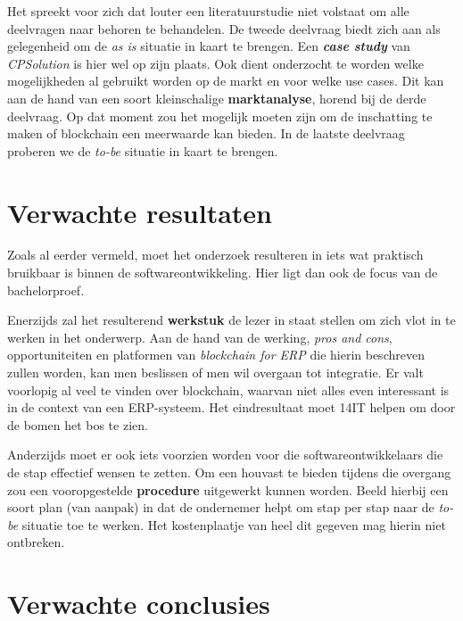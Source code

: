 Het spreekt voor zich dat louter een literatuurstudie niet volstaat om alle deelvragen naar behoren te behandelen. 
De tweede deelvraag biedt zich aan als gelegenheid om de \textit{as is} situatie in kaart te brengen. Een \textbf{\textit{case study}} van \textit{CPSolution} is hier wel op zijn plaats. Ook dient onderzocht te worden welke mogelijkheden al gebruikt worden op de markt en voor welke use cases. Dit kan aan de hand van een soort kleinschalige \textbf{marktanalyse}, horend bij de derde deelvraag. Op dat moment zou het mogelijk moeten zijn om de inschatting te maken of blockchain een meerwaarde kan bieden. In de laatste deelvraag proberen we de \textit{to-be} situatie in kaart te brengen.


\section{Verwachte resultaten}
\label{sec:verwachte_resultaten}

Zoals al eerder vermeld, moet het onderzoek resulteren in iets wat praktisch bruikbaar is binnen de softwareontwikkeling. Hier ligt dan ook de focus van de bachelorproef.

Enerzijds zal het resulterend \textbf{werkstuk} de lezer in staat stellen om zich vlot in te werken in het onderwerp. Aan de hand van de werking, \textit{pros and cons}, opportuniteiten en platformen van \textit{blockchain for ERP} die hierin beschreven zullen worden, kan men beslissen of men wil overgaan tot integratie. Er valt voorlopig al veel te vinden over blockchain, waarvan niet alles even interessant is in de context van een ERP-systeem. Het eindresultaat moet 14IT helpen om door de bomen het bos te zien.

Anderzijds moet er ook iets voorzien worden voor die softwareontwikkelaars die de stap effectief wensen te zetten. Om een houvast te bieden tijdens die overgang zou een vooropgestelde \textbf{procedure} uitgewerkt kunnen worden. Beeld hierbij een soort plan (van aanpak) in dat de ondernemer helpt om stap per stap naar de \textit{to-be} situatie toe te werken. Het kostenplaatje van heel dit gegeven mag hierin niet ontbreken.


\section{Verwachte conclusies}
\label{sec:verwachte_conclusies}

